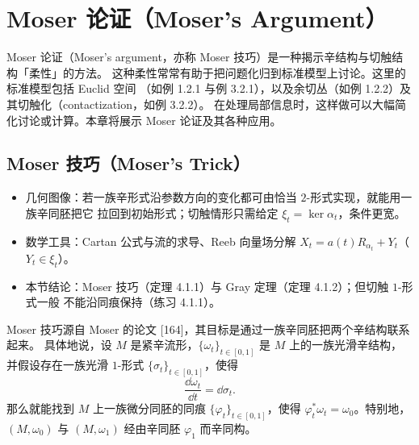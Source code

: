 
\chapter{Moser 论证（Moser's Argument）}

Moser 论证（Moser's argument，亦称 Moser 技巧）是一种揭示辛结构与切触结构「柔性」的方法。
这种柔性常常有助于把问题化归到标准模型上讨论。这里的标准模型包括 Euclid 空间
（如例 1.2.1 与例 3.2.1），以及余切丛（如例 1.2.2）及其切触化（contactization，如例 3.2.2）。
在处理局部信息时，这样做可以大幅简化讨论或计算。本章将展示 Moser 论证及其各种应用。

\section{Moser 技巧（Moser's Trick）}

\begin{keytakeaways}
\begin{itemize}
  \item 几何图像：若一族辛形式沿参数方向的变化都可由恰当 $2$-形式实现，就能用一族辛同胚把它
        拉回到初始形式；切触情形只需给定 $\xi_t=\ker\alpha_t$，条件更宽。
  \item 数学工具：Cartan 公式与流的求导、Reeb 向量场分解
        $X_t=a(t)R_{\alpha_t}+Y_t$（$Y_t\in\xi_t$）。
  \item 本节结论：Moser 技巧（定理 4.1.1）与 Gray 定理（定理 4.1.2）；但切触 $1$-形式一般
        不能沿同痕保持（练习 4.1.1）。
\end{itemize}
\end{keytakeaways}

Moser 技巧源自 Moser 的论文 [164]，其目标是通过一族辛同胚把两个辛结构联系起来。
具体地说，设 $M$ 是紧辛流形，$\{\omega_t\}_{t\in[0,1]}$ 是 $M$ 上的一族光滑辛结构，
并假设存在一族光滑 $1$-形式 $\{\sigma_t\}_{t\in[0,1]}$，使得
\begin{equation}\tag{4.1}
  \frac{\dd\omega_t}{\dd t}=\dd\sigma_t.
\end{equation}
那么就能找到 $M$ 上一族微分同胚的同痕 $\{\varphi_t\}_{t\in[0,1]}$，使得
$\varphi_t^*\omega_t=\omega_0$。特别地，$(M,\omega_0)$ 与 $(M,\omega_1)$ 经由辛同胚
$\varphi_1$ 而辛同构。

